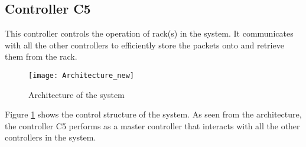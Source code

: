 \subsection*{Controller \textbf{C5}}
This controller controls the operation of rack(s) in the system. It communicates with all the other controllers to efficiently store the packets onto and retrieve them from the rack.

\begin{figure}[h]
\center
\texttt{[image: Architecture\_new]}
\caption{Architecture of the system}
\label{fig:architecture}
\end{figure}

Figure \ref{fig:architecture} shows the control structure of the system. As seen from the architecture, the controller C5 performs as a master controller that interacts with all the other controllers in the system. 